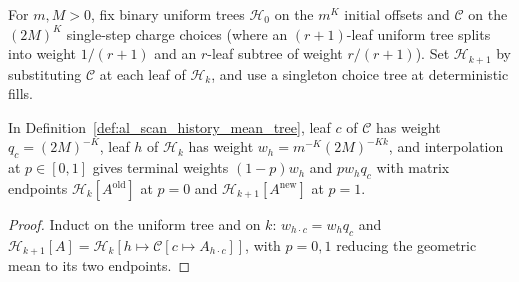\begin{definition}
    \label{def:al_scan_history_mean_tree}
    \leanok
    For $m,M>0$, fix binary uniform trees $\mathcal H_0$ on the $m^K$ initial
    offsets and $\mathcal C$ on the $(2M)^K$ single-step charge choices (where
    an $(r+1)$-leaf uniform tree splits into weight $1/(r+1)$ and an $r$-leaf
    subtree of weight $r/(r+1)$). Set $\mathcal H_{k+1}$ by substituting
    $\mathcal C$ at each leaf of $\mathcal H_k$, and use a singleton choice
    tree at deterministic fills.
\end{definition}

\begin{lemma}
    \label{thm:al_scan_history_mean_tree_endpoints}
    \leanok
    In Definition~\ref{def:al_scan_history_mean_tree}, leaf $c$ of $\mathcal C$
    has weight $q_c=(2M)^{-K}$, leaf $h$ of $\mathcal H_k$ has weight
    $w_h=m^{-K}(2M)^{-Kk}$, and interpolation at $p\in[0,1]$ gives terminal
    weights $(1-p)w_h$ and $pw_hq_c$ with matrix endpoints $\mathcal H_k[A^{\mathrm{old}}]$
    at $p=0$ and $\mathcal H_{k+1}[A^{\mathrm{new}}]$ at $p=1$.
\end{lemma}
\begin{proof}\leanok
    Induct on the uniform tree and on $k$:
    $w_{h\cdot c}=w_hq_c$ and
    $\mathcal H_{k+1}[A]=\mathcal H_k[h\mapsto\mathcal C[c\mapsto A_{h\cdot c}]]$, %
    with $p=0,1$ reducing the geometric mean to its two endpoints.
\end{proof}

